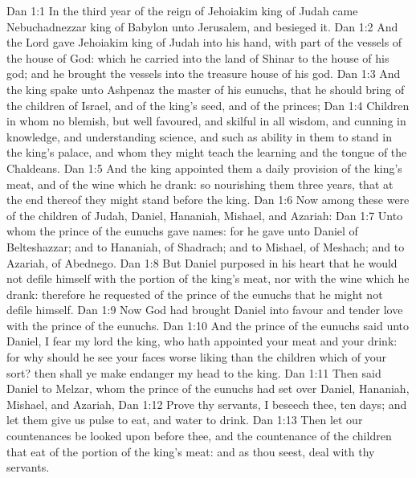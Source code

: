 \vs Dan 1:1 In the third year of the reign of Jehoiakim king of Judah came Nebuchadnezzar king of Babylon unto Jerusalem, and besieged it.
\vs Dan 1:2 And the Lord gave Jehoiakim king of Judah into his hand, with part of the vessels of the house of God: which he carried into the land of Shinar to the house of his god; and he brought the vessels into the treasure house of his god.
\vs Dan 1:3 And the king spake unto Ashpenaz the master of his eunuchs, that he should bring  of the children of Israel, and of the king's seed, and of the princes;
\vs Dan 1:4 Children in whom  no blemish, but well favoured, and skilful in all wisdom, and cunning in knowledge, and understanding science, and such as  ability in them to stand in the king's palace, and whom they might teach the learning and the tongue of the Chaldeans.
\vs Dan 1:5 And the king appointed them a daily provision of the king's meat, and of the wine which he drank: so nourishing them three years, that at the end thereof they might stand before the king.
\vs Dan 1:6 Now among these were of the children of Judah, Daniel, Hananiah, Mishael, and Azariah:
\vs Dan 1:7 Unto whom the prince of the eunuchs gave names: for he gave unto Daniel  of Belteshazzar; and to Hananiah, of Shadrach; and to Mishael, of Meshach; and to Azariah, of Abednego.
\vs Dan 1:8 But Daniel purposed in his heart that he would not defile himself with the portion of the king's meat, nor with the wine which he drank: therefore he requested of the prince of the eunuchs that he might not defile himself.
\vs Dan 1:9 Now God had brought Daniel into favour and tender love with the prince of the eunuchs.
\vs Dan 1:10 And the prince of the eunuchs said unto Daniel, I fear my lord the king, who hath appointed your meat and your drink: for why should he see your faces worse liking than the children which  of your sort? then shall ye make  endanger my head to the king.
\vs Dan 1:11 Then said Daniel to Melzar, whom the prince of the eunuchs had set over Daniel, Hananiah, Mishael, and Azariah,
\vs Dan 1:12 Prove thy servants, I beseech thee, ten days; and let them give us pulse to eat, and water to drink.
\vs Dan 1:13 Then let our countenances be looked upon before thee, and the countenance of the children that eat of the portion of the king's meat: and as thou seest, deal with thy servants.
